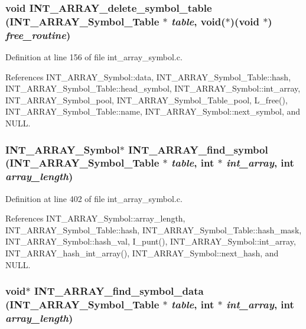 \subsubsection{\setlength{\rightskip}{0pt plus 5cm}void INT\_\-ARRAY\_\-delete\_\-symbol\_\-table (\bf{INT\_\-ARRAY\_\-Symbol\_\-Table} $\ast$ {\em table}, void($\ast$)(void $\ast$) {\em free\_\-routine})}\label{int__array__symbol_8h_336e609695f0bbfbe0630d7e0e14a971}




Definition at line 156 of file int\_\-array\_\-symbol.c.

References INT\_\-ARRAY\_\-Symbol::data, INT\_\-ARRAY\_\-Symbol\_\-Table::hash, INT\_\-ARRAY\_\-Symbol\_\-Table::head\_\-symbol, INT\_\-ARRAY\_\-Symbol::int\_\-array, INT\_\-ARRAY\_\-Symbol\_\-pool, INT\_\-ARRAY\_\-Symbol\_\-Table\_\-pool, L\_\-free(), INT\_\-ARRAY\_\-Symbol\_\-Table::name, INT\_\-ARRAY\_\-Symbol::next\_\-symbol, and NULL.
\subsubsection{\setlength{\rightskip}{0pt plus 5cm}\bf{INT\_\-ARRAY\_\-Symbol}$\ast$ INT\_\-ARRAY\_\-find\_\-symbol (\bf{INT\_\-ARRAY\_\-Symbol\_\-Table} $\ast$ {\em table}, int $\ast$ {\em int\_\-array}, int {\em array\_\-length})}\label{int__array__symbol_8h_9b846e6e16887ccf4d75d254cb8256e4}




Definition at line 402 of file int\_\-array\_\-symbol.c.

References INT\_\-ARRAY\_\-Symbol::array\_\-length, INT\_\-ARRAY\_\-Symbol\_\-Table::hash, INT\_\-ARRAY\_\-Symbol\_\-Table::hash\_\-mask, INT\_\-ARRAY\_\-Symbol::hash\_\-val, I\_\-punt(), INT\_\-ARRAY\_\-Symbol::int\_\-array, INT\_\-ARRAY\_\-hash\_\-int\_\-array(), INT\_\-ARRAY\_\-Symbol::next\_\-hash, and NULL.
\subsubsection{\setlength{\rightskip}{0pt plus 5cm}void$\ast$ INT\_\-ARRAY\_\-find\_\-symbol\_\-data (\bf{INT\_\-ARRAY\_\-Symbol\_\-Table} $\ast$ {\em table}, int $\ast$ {\em int\_\-array}, int {\em array\_\-length})}\label{int__array__symbol_8h_1d9cc88d4a195673ae9018df1643ae67}




